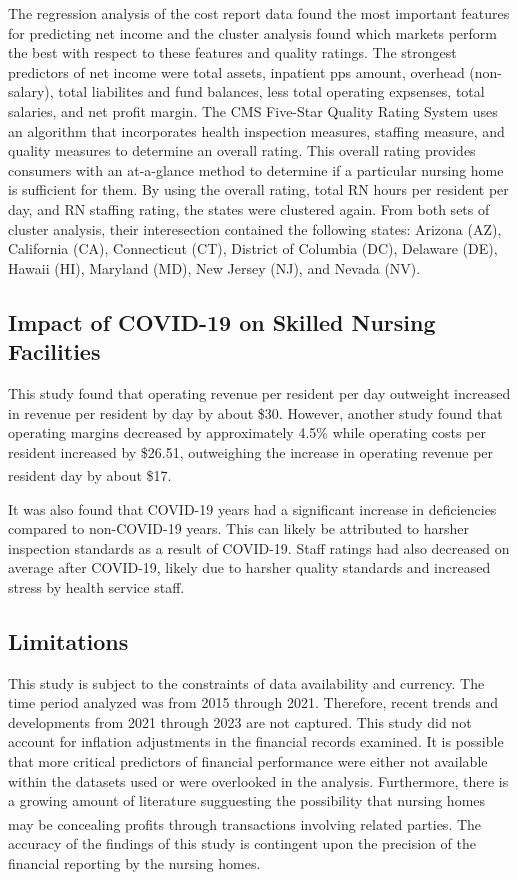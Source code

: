 \documentclass{article}
\theoremstyle{mytheoremstyle}
\theoremstyle{mytheoremstyle}
\theoremstyle{myproblemstyle}
\begin{document}
The regression analysis of the cost report data found the most important features for predicting net income and the cluster analysis found which markets perform the best with respect to these features and quality ratings. The strongest predictors of net income were total assets, inpatient pps amount, overhead (non-salary), total liabilites and fund balances, less total operating expsenses, total salaries, and net profit margin. The CMS Five-Star Quality Rating System uses an algorithm that incorporates health inspection measures, staffing measure, and quality measures to determine an overall rating. This overall rating provides consumers with an at-a-glance method to determine if a particular nursing home is sufficient for them. By using the overall rating, total RN hours per resident per day, and RN staffing rating, the states were clustered again. From both sets of cluster analysis, their interesection contained the following states: Arizona (AZ), California (CA), Connecticut (CT), District of Columbia (DC), Delaware (DE), Hawaii (HI), Maryland (MD), New Jersey (NJ), and Nevada (NV).

\subsection{Impact of COVID-19 on Skilled Nursing Facilities}
This study found that operating revenue per resident per day outweight increased in revenue per resident by day by about \$30. However, another study found that operating margins decreased by approximately 4.5\% while operating costs per resident increased by \$26.51, outweighing the increase in operating revenue per resident day by about \$17\textsuperscript{\cite{orewa2024}}.

It was also found that COVID-19 years had a significant increase in deficiencies compared to non-COVID-19 years. This can likely be attributed to harsher inspection standards as a result of COVID-19. Staff ratings had also decreased on average after COVID-19, likely due to harsher quality standards and increased stress by health service staff.   

\subsection{Limitations}

This study is subject to the constraints of data availability and currency. The time period analyzed was from 2015 through 2021. Therefore, recent trends and developments from 2021 through 2023 are not captured. This study did not account for inflation adjustments in the financial records examined. It is possible that more critical predictors of financial performance were either not available within the datasets used or were overlooked in the analysis. Furthermore, there is a growing amount of literature sugguesting the possibility that nursing homes may be concealing profits through transactions involving related parties\textsuperscript{\cite{harrington2024united}}. The accuracy of the findings of this study is contingent upon the precision of the financial reporting by the nursing homes. 
\end{document}

